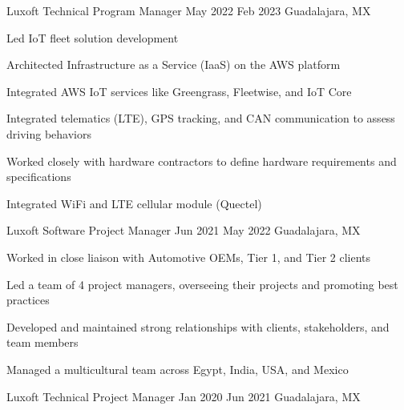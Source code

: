 \documentclass{resume} %
\begin{document}
\job
    {Luxoft}
    {Technical Program Manager}
    {May 2022}
    {Feb 2023}
    {Guadalajara, MX}
    {
    \begin{itemize-bullets}
    \item{Led IoT fleet solution development}
    \item{Architected Infrastructure as a Service (IaaS) on the AWS platform}
    \item{Integrated AWS IoT services like Greengrass, Fleetwise, and IoT Core}
    \item{Integrated telematics (LTE), GPS tracking, and CAN communication to assess driving behaviors}
    \item{Worked closely with hardware contractors to define hardware requirements and specifications}
    \item{Integrated WiFi and LTE cellular module (Quectel)}
    \end{itemize-bullets}
    }


\job
    {Luxoft}
    {Software Project Manager}
    {Jun 2021}
    {May 2022}
    {Guadalajara, MX}
    {
    \begin{itemize-bullets}
    \item{Worked in close liaison with Automotive OEMs, Tier 1, and Tier 2 clients}
    \item{Led a team of 4 project managers, overseeing their projects and promoting best practices}
    \item{Developed and maintained strong relationships with clients, stakeholders, and team members}
    \item{Managed a multicultural team across Egypt, India, USA, and Mexico}
    \end{itemize-bullets}
    }


\job
    {Luxoft}
    {Technical Project Manager}
    {Jan 2020}
    {Jun 2021}
    {Guadalajara, MX}
    {
    }
\end{document}
